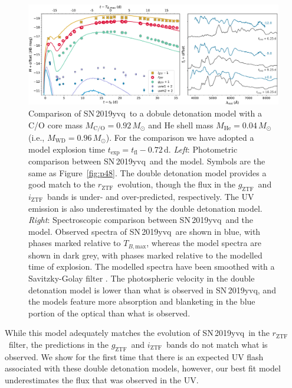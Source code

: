 \documentclass[twocolumn]{aastex63}
\newcommand{\rztf}{$r_\mathrm{ZTF}$}
\newcommand{\gztf}{$g_\mathrm{ZTF}$}
\newcommand{\iztf}{$i_\mathrm{ZTF}$}
\newcommand{\tbmax}{$T_{B,\mathrm{max}}$}
\newcommand{\sn}{SN\,2019yvq}
\begin{document}
\begin{figure}
    \centering
    \includegraphics[width=\textwidth]{./figures/double_det.pdf}
    \caption{Comparison of \sn\ to a dobule detonation model with a C/O core
    mass $M_\mathrm{C/O} = 0.92\,M_\odot$ and He shell mass $M_\mathrm{He} =
    0.04\,M_\odot$ (i.e., $M_\mathrm{WD} = 0.96\,M_\odot$). For the comparison
    we have adopted a model explosion time $t_\mathrm{exp} = t_\mathrm{fl} -
    0.72$\,d. \textit{Left}: Photometric comparison between \sn\ and the
    model. Symbols are the same as Figure~\ref{fig:p48}. The double detonation
    model provides a good match to the \rztf\ evolution, though the flux in
    the \gztf\ and \iztf\ bands is under- and over-predicted, respectively.
    The UV emission is also underestimated by the double detonation model.
    \textit{Right}: Spectroscopic comparison between \sn\ and the model.
    Observed spectra of \sn\ are shown in blue, with phases marked relative to
    \tbmax, whereas the model spectra are shown in dark grey, with phases
    marked relative to the modelled time of explosion. The modelled spectra
    have been smoothed with a Savitzky-Golay filter \citep{Savitzky64}. The
    photospheric velocity in the double detonation model is lower than what is
    observed in \sn, and the models feature more absorption and blanketing in
    the blue portion of the optical than what is observed. }
    \label{fig:double_det}
\end{figure}

While this model adequately matches the evolution of \sn\ in the \rztf\
filter, the predictions in the \gztf\ and \iztf\ bands do not match what is
observed. We show for the first time that there is an expected UV flash
associated with these double detonation models, however, our best fit model
underestimates the flux that was observed in the UV.
\end{document}
